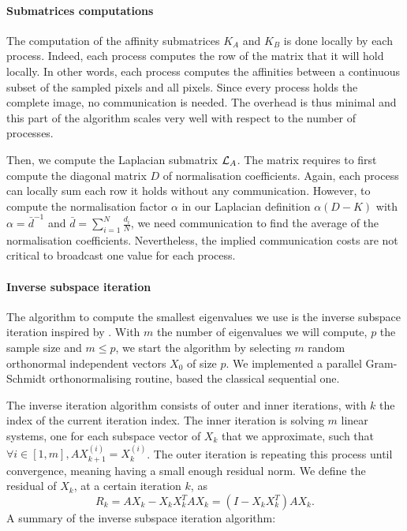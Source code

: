 \paragraph{Submatrices computations}
The computation of the affinity submatrices \(K_A\) and \(K_B\) is done locally by each process.
Indeed, each process computes the row of the matrix that it will hold locally.
In other words, each process computes the affinities between a continuous subset of the sampled pixels and all pixels.
Since every process holds the complete image, no communication is needed.
The overhead is thus minimal and this part of the algorithm scales very well with respect to the number of processes.

Then, we compute the Laplacian submatrix \(\operatorname{\mathcal{L}}_A\).
The matrix requires to first compute the diagonal matrix \(D\) of normalisation coefficients.
Again, each process can locally sum each row it holds without any communication.
However, to compute the normalisation factor \(\alpha\) in our Laplacian definition \(\alpha (D - K)\) with \(\alpha = \bar{d}^{-1}\) and \(\bar{d} = \sum^N_{i=1} \frac{d_i}{N}\), we need communication to find the average of the normalisation coefficients.
Nevertheless, the implied communication costs are not critical to broadcast one value for each process.

\paragraph{Inverse subspace iteration}
The algorithm to compute the smallest eigenvalues we use is the inverse subspace iteration inspired by \cite{el_khoury_acceleration_2014}.
With \(m\) the number of eigenvalues we will compute, \(p\) the sample size and \(m \le p\), we start the algorithm by selecting \(m\) random orthonormal independent vectors \(X_0\) of size \(p\).
We implemented a parallel Gram-Schmidt orthonormalising routine, based the classical sequential one.

The inverse iteration algorithm consists of outer and inner iterations, with \(k\) the index of the current iteration index.
The inner iteration is solving \(m\) linear systems, one for each subspace vector of \(X_k\) that we approximate, such that \(\forall i \in [1, m], A X_{k+1}^{(i)} = X_k^{(i)}\).
The outer iteration is repeating this process until convergence, meaning having a small enough residual norm.
We define the residual of \(X_k\), at a certain iteration \(k\), as
\[R_k = A X_k - X_k X_k^T A X_k = (I - X_k X_k^T) A X_k.\]
A summary of the inverse subspace iteration algorithm:

